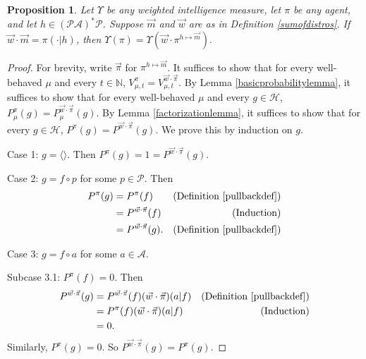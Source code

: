 \documentclass[twoside]{article}
\newtheorem{proposition}[theorem]{Proposition}
\begin{document}
\begin{proposition}
\label{longproposition}
    Let $\Upsilon$ be any weighted intelligence measure, let $\pi$ be any agent,
    and let $h\in(\mathcal P\mathcal A)^*\mathcal P$.
    Suppose $\vec m$ and $\vec w$ are as in Definition \ref{sumofdistros}.
    If $\vec w\cdot\vec m = \pi(\cdot|h)$, then
    $
        \Upsilon(\pi)
        =
        \Upsilon(\vec w\cdot \pi^{h\mapsto \vec m}).
    $
\end{proposition}

\begin{proof}
    For brevity, write $\vec\pi$ for $\pi^{h\mapsto \vec m}$. It suffices to
    show that for every well-behaved $\mu$ and every $t\in\mathbb N$,
    $
        V^{\pi}_{\mu,t}
        =
        V^{\vec w\cdot \vec\pi}_{\mu,t}.
    $
    By Lemma \ref{basicprobabilitylemma}, it suffices to show that for every
    well-behaved $\mu$ and every $g\in\mathcal H$,
    $
    P^\pi_\mu(g)
    =
    P^{\vec w\cdot\vec\pi}_\mu(g)
    $.
    By Lemma \ref{factorizationlemma}, it suffices
    to show that for every $g\in\mathcal H$,
    $P^\pi(g)=P^{\vec w\cdot\vec\pi}(g)$.
    We prove this by induction on $g$.

    Case 1: $g=\langle\rangle$.
    Then $P^\pi(g)=1
    =P^{\vec w\cdot\vec\pi}(g)$.

    Case 2: $g=f\circ p$ for some $p\in\mathcal P$.
    Then
    \begin{align*}
        P^\pi(g)
            &= P^\pi(f)
                &\mbox{(Definition \ref{pullbackdef})}\\
            &= P^{\vec w\cdot\vec\pi}(f)
                &\mbox{(Induction)}\\
            &= P^{\vec w\cdot\vec\pi}(g).
                &\mbox{(Definition \ref{pullbackdef})}
    \end{align*}

    Case 3: $g=f\circ a$ for some $a\in\mathcal A$.

    Subcase 3.1: $P^\pi(f)=0$.
    Then
    \begin{align*}
        P^{\vec w\cdot\vec\pi}(g)
            &= P^{\vec w\cdot\vec\pi}(f)
            (\vec w\cdot\vec\pi)(a|f)
                &\mbox{(Definition \ref{pullbackdef})}\\
            &= P^\pi(f)(\vec w\cdot\vec\pi)(a|f)
                &\mbox{(Induction)}\\
            &= 0.
    \end{align*}
    Similarly, $P^\pi(g)=0$. So $P^{\vec w\cdot\vec\pi}(g)=P^\pi(g)$.


\end{proof}
\end{document}
